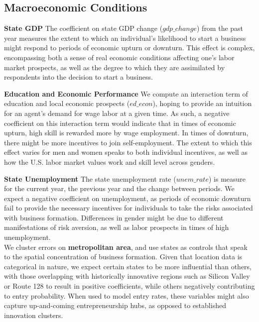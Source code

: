 \subsection{Macroeconomic Conditions}

\textbf{State GDP} The coefficient on state GDP change ($gdp\_change$) from the past year measures the extent to which an individual's likelihood to start a business might respond to periods of economic upturn or downturn. This effect is complex, encompassing both a sense of real economic conditions affecting one's labor market prospects, as well as the degree to which they are assimilated by respondents into the decision to start a business.

\textbf{Education and Economic Performance} We compute an interaction term of education and local economic prospects ($ed\_econ$), hoping to provide an intuition for an agent's demand for wage labor at a given time. As such, a negative coefficient on this interaction term would indicate that in times of economic upturn, high skill is rewarded more by wage employment. In times of downturn, there might be more incentives to join self-employment. The extent to which this effect varies for men and women speaks to both individual incentives, as well as how the U.S. labor market values work and skill level across genders. 

\textbf{State Unemployment} The state unemployment rate ($unem\_rate$) is measure for the current year, the previous year and the change between periods. We expect a negative coefficient on unemployment, as periods of economic downturn fail to provide the necessary incentives for individuals to take the risks associated with business formation. Differences in gender might be due to different manifestations of risk aversion, as well as labor prospects in times of high unemployment. \\

We cluster errors on \textbf{metropolitan area}, and use states as controls that speak to the spatial concentration of business formation. Given that location data is categorical in nature, we expect certain states to be more influential than others, with those overlapping with historically innovative regions such as Silicon Valley or Route 128 to result in positive coefficients, while others negatively contributing to entry probability. When used to model entry rates, these variables might also capture up-and-coming entrepreneurship hubs, as opposed to established innovation clusters. 
































